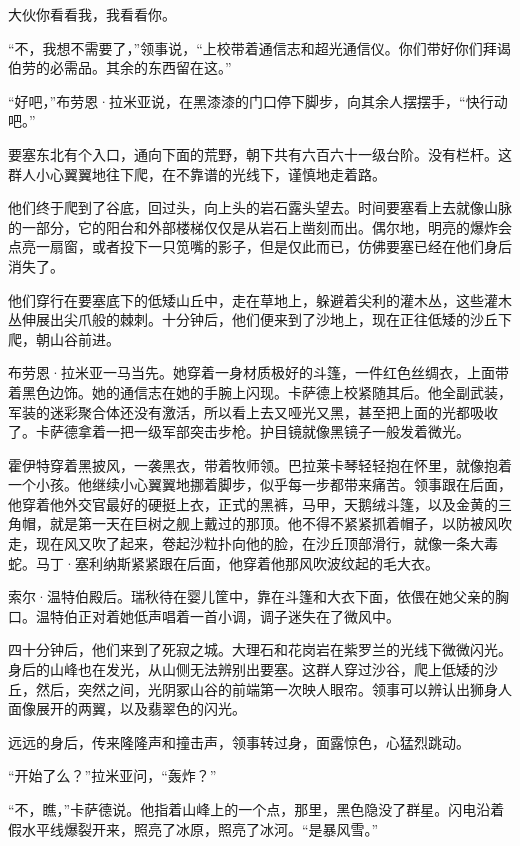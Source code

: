 \documentclass[AutoFakeBold=true]{book}
\begin{document}
大伙你看看我，我看看你。

``不，我想不需要了，''领事说，``上校带着通信志和超光通信仪。你们带好你们拜谒伯劳的必需品。其余的东西留在这。''

``好吧，''布劳恩·拉米亚说，在黑漆漆的门口停下脚步，向其余人摆摆手，``快行动吧。''

\vspace*{1em}

要塞东北有个入口，通向下面的荒野，朝下共有六百六十一级台阶。没有栏杆。这群人小心翼翼地往下爬，在不靠谱的光线下，谨慎地走着路。

他们终于爬到了谷底，回过头，向上头的岩石露头望去。时间要塞看上去就像山脉的一部分，它的阳台和外部楼梯仅仅是从岩石上凿刻而出。偶尔地，明亮的爆炸会点亮一扇窗，或者投下一只笕嘴的影子，但是仅此而已，仿佛要塞已经在他们身后消失了。

他们穿行在要塞底下的低矮山丘中，走在草地上，躲避着尖利的灌木丛，这些灌木丛伸展出尖爪般的棘刺。十分钟后，他们便来到了沙地上，现在正往低矮的沙丘下爬，朝山谷前进。

布劳恩·拉米亚一马当先。她穿着一身材质极好的斗篷，一件红色丝绸衣，上面带着黑色边饰。她的通信志在她的手腕上闪现。卡萨德上校紧随其后。他全副武装，军装的迷彩聚合体还没有激活，所以看上去又哑光又黑，甚至把上面的光都吸收了。卡萨德拿着一把一级军部突击步枪。护目镜就像黑镜子一般发着微光。

霍伊特穿着黑披风，一袭黑衣，带着牧师领。巴拉莱卡琴轻轻抱在怀里，就像抱着一个小孩。他继续小心翼翼地挪着脚步，似乎每一步都带来痛苦。领事跟在后面，他穿着他外交官最好的硬挺上衣，正式的黑裤，马甲，天鹅绒斗篷，以及金黄的三角帽，就是第一天在巨树之舰上戴过的那顶。他不得不紧紧抓着帽子，以防被风吹走，现在风又吹了起来，卷起沙粒扑向他的脸，在沙丘顶部滑行，就像一条大毒蛇。马丁·塞利纳斯紧紧跟在后面，他穿着他那风吹波纹起的毛大衣。

索尔·温特伯殿后。瑞秋待在婴儿筐中，靠在斗篷和大衣下面，依偎在她父亲的胸口。温特伯正对着她低声唱着一首小调，调子迷失在了微风中。

四十分钟后，他们来到了死寂之城。大理石和花岗岩在紫罗兰的光线下微微闪光。身后的山峰也在发光，从山侧无法辨别出要塞。这群人穿过沙谷，爬上低矮的沙丘，然后，突然之间，光阴冢山谷的前端第一次映人眼帘。领事可以辨认出狮身人面像展开的两翼，以及翡翠色的闪光。

远远的身后，传来隆隆声和撞击声，领事转过身，面露惊色，心猛烈跳动。

``开始了么？''拉米亚问，``轰炸？''

``不，瞧，''卡萨德说。他指着山峰上的一个点，那里，黑色隐没了群星。闪电沿着假水平线爆裂开来，照亮了冰原，照亮了冰河。``是暴风雪。''
\end{document}
